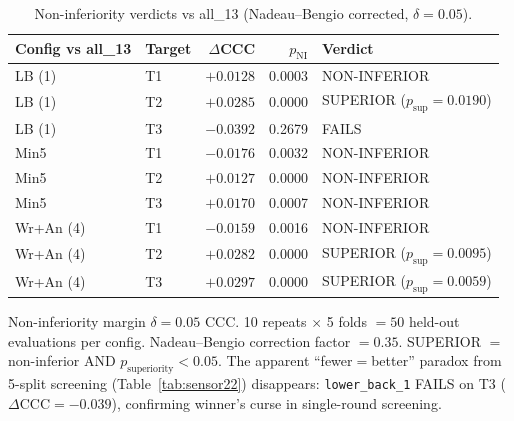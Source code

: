 \documentclass[11pt,a4paper]{article}
\newcommand{\tabnote}[1]{\par\vspace{2pt}\noindent\begin{minipage}{\linewidth}\small\itshape\raggedright #1\par\end{minipage}\par\vspace{0.4em}}
\begin{document}
\begin{table}[H]
\centering
\addtocounter{table}{-1}
\renewcommand{\thetable}{9 (cont)}
\caption{Non-inferiority verdicts vs all\_13 (Nadeau--Bengio corrected, $\delta=0.05$).}
\renewcommand{\thetable}{\arabic{table}}
\label{tab:noninf}
\begin{tabular}{llrrl}
\toprule
\textbf{Config vs all\_13} & \textbf{Target} & $\Delta$\textbf{CCC} & $p_{\mathrm{NI}}$ & \textbf{Verdict} \\
\midrule
LB (1)      & T1 & $+0.0128$ & 0.0003 & NON-INFERIOR \\
LB (1)      & T2 & $+0.0285$ & 0.0000 & SUPERIOR ($p_{\mathrm{sup}}=0.0190$) \\
LB (1)      & T3 & $-0.0392$ & 0.2679 & FAILS \\
Min5        & T1 & $-0.0176$ & 0.0032 & NON-INFERIOR \\
Min5        & T2 & $+0.0127$ & 0.0000 & NON-INFERIOR \\
Min5        & T3 & $+0.0170$ & 0.0007 & NON-INFERIOR \\
Wr+An (4)   & T1 & $-0.0159$ & 0.0016 & NON-INFERIOR \\
Wr+An (4)   & T2 & $+0.0282$ & 0.0000 & SUPERIOR ($p_{\mathrm{sup}}=0.0095$) \\
Wr+An (4)   & T3 & $+0.0297$ & 0.0000 & SUPERIOR ($p_{\mathrm{sup}}=0.0059$) \\
\bottomrule
\end{tabular}
\tabnote{Non-inferiority margin $\delta=0.05$ CCC. 10 repeats $\times$ 5 folds $= 50$ held-out evaluations per config. Nadeau--Bengio correction factor $=0.35$. SUPERIOR $=$ non-inferior AND $p_{\mathrm{superiority}}<0.05$. The apparent ``fewer$=$better'' paradox from 5-split screening (Table~\ref{tab:sensor22}) disappears: \texttt{lower\_back\_1} FAILS on T3 ($\Delta\mathrm{CCC}=-0.039$), confirming winner's curse in single-round screening.}
\end{table}
\end{document}
